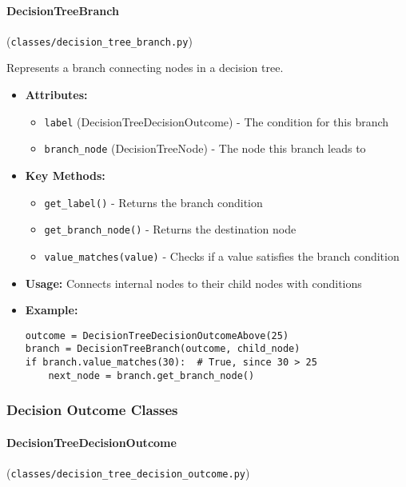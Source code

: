 \documentclass[
english,
smallborders
]{i6prcsht}
\begin{document}
\vspace*{0.3cm}

\paragraph{DecisionTreeBranch} (\texttt{classes/decision\_tree\_branch.py})

Represents a branch connecting nodes in a decision tree.

\begin{itemize}
	\item \textbf{Attributes:}
	      \begin{itemize}
		      \item \texttt{label} (DecisionTreeDecisionOutcome) - The condition for this branch
		      \item \texttt{branch\_node} (DecisionTreeNode) - The node this branch leads to
	      \end{itemize}
	\item \textbf{Key Methods:}
	      \begin{itemize}
		      \item \texttt{get\_label()} - Returns the branch condition
		      \item \texttt{get\_branch\_node()} - Returns the destination node
		      \item \texttt{value\_matches(value)} - Checks if a value satisfies the branch condition
	      \end{itemize}
	\item \textbf{Usage:} Connects internal nodes to their child nodes with conditions
	\item \textbf{Example:}
	      \begin{lstlisting}
outcome = DecisionTreeDecisionOutcomeAbove(25)
branch = DecisionTreeBranch(outcome, child_node)
if branch.value_matches(30):  # True, since 30 > 25
    next_node = branch.get_branch_node()
    \end{lstlisting}
\end{itemize}

\vspace*{0.3cm}

\vspace*{0.5cm}

\subsubsection*{Decision Outcome Classes}

\paragraph{DecisionTreeDecisionOutcome} (\texttt{classes/decision\_tree\_decision\_outcome.py})
\end{document}
